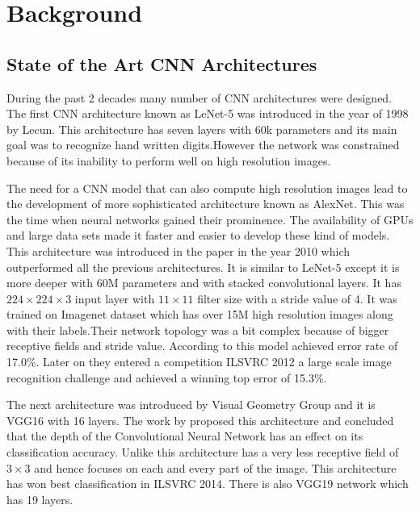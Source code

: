 \chapter{Background}\label{chap:background}
\section{State of the Art CNN Architectures}
During the past 2 decades many number of CNN architectures were designed. The first CNN architecture known as LeNet-5 was introduced in the year of 1998 by Lecun. This architecture has seven layers with 60k parameters and its main goal was to recognize hand written digits.However the network was constrained because of its inability to perform well on high resolution images.

The need for a CNN model that can also compute high resolution images lead to the development of more sophisticated architecture known as AlexNet. This was the time when neural networks gained their prominence.  The availability of GPUs and large data sets made it faster and easier to develop these kind of models. This architecture was introduced in the paper\cite{Krizhevsky} in the year 2010 which outperformed all the previous architectures. It is similar to LeNet-5 except it is more deeper with 60M parameters and with stacked convolutional layers. It has $224\times224\times3$ input layer with $11\times11 $ filter size with a stride value of 4. It was trained on Imagenet dataset which has over 15M high resolution images along with their labels.Their network topology was a bit complex because of bigger receptive fields and stride value.  According to \cite{Krizhevsky} this model achieved error rate of 17.0\%. Later on they entered a competition ILSVRC 2012 a large scale image recognition challenge and achieved a winning top error of 15.3\%. 

The next architecture was introduced by Visual Geometry Group and it is VGG16 with 16 layers. The work by \cite{SimonyanZ14a} proposed this architecture and concluded that the depth of the Convolutional Neural Network has an effect on its classification accuracy. Unlike \cite{Krizhevsky} this architecture has a very less receptive field of $3\times3$ and hence focuses on each and every part of the image. This architecture has won best classification in ILSVRC 2014. There is also VGG19 network which has 19 layers.

